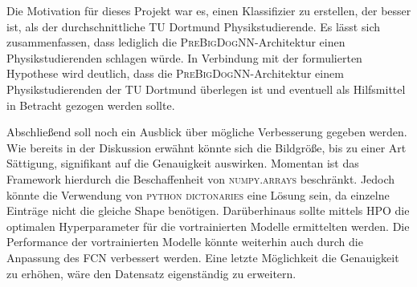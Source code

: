 Die Motivation für dieses Projekt war es, einen Klassifizier zu erstellen,
der besser ist, als der durchschnittliche TU Dortmund Physikstudierende.
Es lässt sich zusammenfassen, dass lediglich die \textsc{PreBigDogNN}-Architektur
einen Physikstudierenden schlagen würde. In Verbindung mit
der formulierten Hypothese wird deutlich, dass die \textsc{PreBigDogNN}-Architektur
einem Physikstudierenden der TU Dortmund überlegen ist und eventuell als Hilfsmittel
in Betracht gezogen werden sollte.

Abschließend soll noch ein Ausblick über mögliche Verbesserung gegeben werden.
Wie bereits in der Diskussion erwähnt könnte sich die Bildgröße, bis zu einer
Art Sättigung, signifikant auf die Genauigkeit auswirken. Momentan ist das
Framework hierdurch die Beschaffenheit von \textsc{numpy.arrays} beschränkt.
Jedoch könnte die Verwendung von \textsc{python} \textsc{dictonaries} eine Lösung sein,
da einzelne Einträge nicht die gleiche Shape benötigen. Darüberhinaus sollte mittels
HPO die optimalen Hyperparameter für die vortrainierten Modelle ermittelten werden.
Die Performance der vortrainierten Modelle könnte weiterhin auch durch die Anpassung
des FCN verbessert werden. Eine letzte Möglichkeit die Genauigkeit zu erhöhen,
wäre den Datensatz eigenständig zu erweitern.

\newpage

